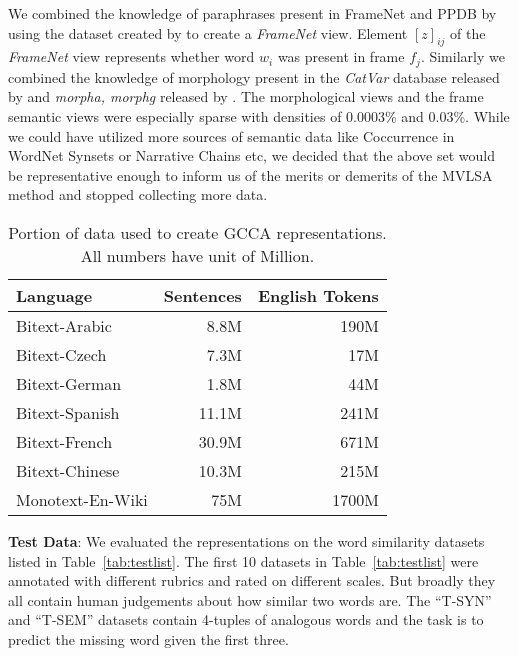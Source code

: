 \documentclass[11pt]{article}
\begin{document}
We combined the knowledge of paraphrases present in FrameNet and PPDB by
using the dataset created by  to create a
\textit{FrameNet} view. Element $[z]_{ij}$ of the \textit{FrameNet}
view represents whether word $w_i$ was present in frame
$f_j$. Similarly we combined the knowledge of morphology present in
the \textit{CatVar} database released by  and
\textit{morpha, morphg} released by .
The morphological views and the frame semantic views were especially
sparse with densities of 0.0003\% and 0.03\%. While we could have utilized more sources of semantic data like
Coccurrence in WordNet Synsets or Narrative Chains etc, we decided
that the above set would be representative enough to inform us of the
merits or demerits of the MVLSA method and stopped collecting more data.

\begin{table}[htbp]
  \centering
  \begin{tabular}{lrr}
    Language & Sentences & English Tokens \\
    \hline
    Bitext-Arabic   & 8.8M   & 190M  \\
    Bitext-Czech    & 7.3M   & 17M   \\
    Bitext-German   & 1.8M   & 44M   \\
    Bitext-Spanish  & 11.1M  & 241M  \\
    Bitext-French   & 30.9M  & 671M  \\
    Bitext-Chinese  & 10.3M  & 215M  \\
    Monotext-En-Wiki& 75M    & 1700M 
  \end{tabular}  
  \caption{Portion of data used to create GCCA representations. All
    numbers have unit of Million.}
  \label{tab:dataperlang}
\end{table}

\noindent\textbf{Test Data}: We evaluated the representations on the
word similarity datasets listed in Table~\ref{tab:testlist}. The first
10 datasets in Table~\ref{tab:testlist} were annotated with different
rubrics and rated on different scales. But broadly they all
contain human judgements about how similar two words are.
The ``T-SYN'' and ``T-SEM'' datasets contain 4-tuples of
analogous words and the task is to predict the missing word given the
first three.
\end{document}
